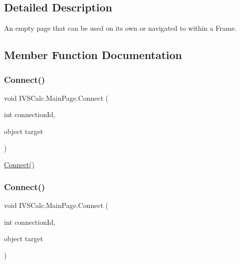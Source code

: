\subsection{Detailed Description}
An empty page that can be used on its own or navigated to within a Frame. 



\subsection{Member Function Documentation}
\mbox{\label{class_i_v_s_calc_1_1_main_page_a36a7263a9c76a6fdfa392266c3b56122}} 
\subsubsection{\texorpdfstring{Connect()}{Connect()}\hspace{0.1cm}{\footnotesize\ttfamily [1/5]}}
{\footnotesize\ttfamily void I\+V\+S\+Calc.\+Main\+Page.\+Connect (\begin{DoxyParamCaption}\item[{int}]{connection\+Id,  }\item[{object}]{target }\end{DoxyParamCaption})}



\hyperlink{class_i_v_s_calc_1_1_main_page_a36a7263a9c76a6fdfa392266c3b56122}{Connect()} 

\mbox{\label{class_i_v_s_calc_1_1_main_page_a36a7263a9c76a6fdfa392266c3b56122}} 
\subsubsection{\texorpdfstring{Connect()}{Connect()}\hspace{0.1cm}{\footnotesize\ttfamily [2/5]}}
{\footnotesize\ttfamily void I\+V\+S\+Calc.\+Main\+Page.\+Connect (\begin{DoxyParamCaption}\item[{int}]{connection\+Id,  }\item[{object}]{target }\end{DoxyParamCaption})}



